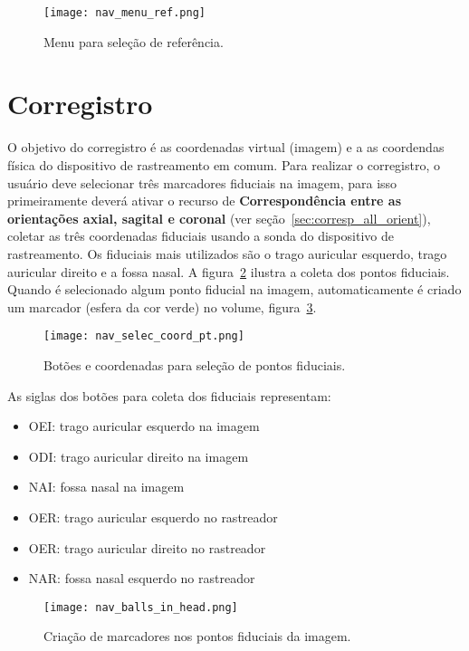 \begin{figure}[!htb]
\centering
\texttt{[image: nav\_menu\_ref.png]}
\caption{Menu para seleção de referência.}
\label{fig:nav_menu_ref}
\end{figure}

\section{Corregistro}
\label{sec:corregistro}

O objetivo do corregistro é as coordenadas virtual (imagem) e a as coordendas física do dispositivo de rastreamento em comum. Para realizar o corregistro, o usuário deve selecionar três marcadores fiduciais na imagem, para isso primeiramente deverá ativar o recurso de \textbf{Correspondência entre as orientações axial, sagital e coronal} (ver seção~\ref{sec:corresp_all_orient}), coletar as três coordenadas fiduciais usando a sonda do dispositivo de rastreamento. Os fiduciais mais utilizados são o trago auricular esquerdo, trago auricular direito e a fossa nasal. A figura~\ref{fig:nav_selec_coord} ilustra a coleta dos pontos fiduciais. Quando é selecionado algum ponto fiducial na imagem, automaticamente é criado um marcador (esfera da cor verde) no volume, figura~\ref{fig:nav_balls_in_head}.

\begin{figure}[!htb]
\centering
\texttt{[image: nav\_selec\_coord\_pt.png]}
\caption{Botões e coordenadas para seleção de pontos fiduciais.}
\label{fig:nav_selec_coord}
\end{figure}

As siglas dos botões para coleta dos fiduciais representam:

\begin{itemize}
	\item OEI: trago auricular esquerdo na imagem
	\item ODI: trago auricular direito na imagem
	\item NAI: fossa nasal na imagem
	\item OER: trago auricular esquerdo no rastreador
	\item OER: trago auricular direito no rastreador
	\item NAR: fossa nasal esquerdo no rastreador
\end{itemize}

\begin{figure}[!htb]
\centering
\texttt{[image: nav\_balls\_in\_head.png]}
\caption{Criação de marcadores nos pontos fiduciais da imagem.}
\label{fig:nav_balls_in_head}
\end{figure}


